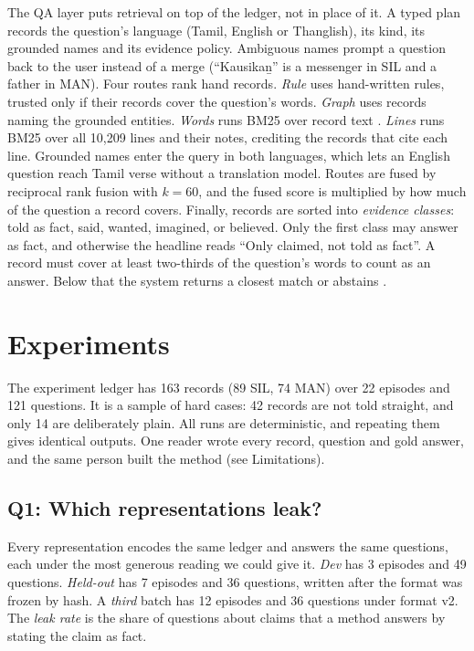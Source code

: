 \documentclass[11pt]{article}
\begin{document}
The QA layer puts retrieval on top of the ledger, not in place of it. A typed plan records the question's language (Tamil, English or Thanglish), its kind, its grounded names and its evidence policy. Ambiguous names prompt a question back to the user instead of a merge (``Kausika\b{n}'' is a messenger in SIL and a father in MAN). Four routes rank hand records. \emph{Rule} uses hand-written rules, trusted only if their records cover the question's words. \emph{Graph} uses records naming the grounded entities. \emph{Words} runs BM25 over record text \citep{Robertson2009Bm25}. \emph{Lines} runs BM25 over all 10,209 lines and their notes, crediting the records that cite each line. Grounded names enter the query in both languages, which lets an English question reach Tamil verse without a translation model. Routes are fused by reciprocal rank fusion \citep{Cormack2009ReciprocalRank} with $k{=}60$, and the fused score is multiplied by how much of the question a record covers. Finally, records are sorted into \emph{evidence classes}: told as fact, said, wanted, imagined, or believed. Only the first class may answer as fact, and otherwise the headline reads ``Only claimed, not told as fact''. A record must cover at least two-thirds of the question's words to count as an answer. Below that the system returns a closest match or abstains \citep{Rajpurkar2018KnowWhat}.

\section{Experiments}
\label{sec:exp}

The experiment ledger has 163 records (89 SIL, 74 MAN) over 22 episodes and 121 questions. It is a sample of hard cases: 42 records are not told straight, and only 14 are deliberately plain. All runs are deterministic, and repeating them gives identical outputs. One reader wrote every record, question and gold answer, and the same person built the method (see Limitations).

\subsection{Q1: Which representations leak?}
\label{sec:rep}
Every representation encodes the same ledger and answers the same questions, each under the most generous reading we could give it. \emph{Dev} has 3 episodes and 49 questions. \emph{Held-out} has 7 episodes and 36 questions, written after the format was frozen by hash. A \emph{third} batch has 12 episodes and 36 questions under format v2. The \emph{leak rate} is the share of questions about claims that a method answers by stating the claim as fact.
\end{document}
